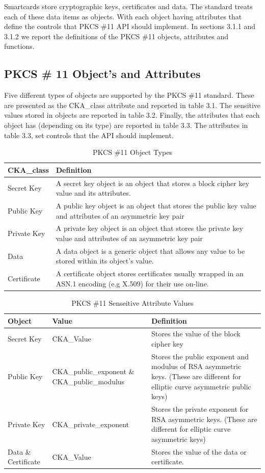 \documentclass[bsc,frontabs,twoside,singlespacing,parskip,deptreport]{infthesis}     %
\begin{document}
Smartcards store cryptographic keys, certificates and data. The standard treats each of these data items as objects. With each object having attributes that define the controls that PKCS \#11 API should implement. In sections 3.1.1 and 3.1.2 we report the definitions of the PKCS \#11 objects, attributes and functions.

\pagebreak
\subsection{PKCS \# 11 Object's and Attributes}

Five different types of objects are supported by the PKCS \#11 standard. These are presented as the CKA\_class attribute and reported in table 3.1. The sensitive values stored in objects are reported in table 3.2. Finally, the attributes that each object has (depending on its type) are reported in table 3.3. The attributes in table 3.3, set controls that the API should implement.

\begin{table}[H]
\begin{tabular}{|l|p{10cm}|}
\hline 
CKA\_class & Definition\\
\hline
Secret Key & A secret key object is an object that stores a block cipher key value and its attributes.\\
\hline
Public Key & A public key object is an object that stores the public key value and attributes of an asymmetric key pair\\
\hline
Private Key & A private key object is an object that stores the private key value and attributes of an asymmetric key pair\\
\hline
Data & A data object is a generic object that allows any value to be stored within its object's value.\\
\hline
Certificate & A certificate object stores certificates usually wrapped in an ASN.1 encoding (e.g X.509) for their use on-line.\\
\hline
\end{tabular}
\caption{PKCS \#11 Object Types}
\end{table}

\begin{table}[H]
\hskip-1.5cm\begin{tabular}{|p{3cm}|p{5cm}|p{10cm}|}
\hline
Object & Value & Definition\\
\hline
Secret Key & CKA\_Value & Stores the value of the block cipher key\\
\hline
Public Key & CKA\_public\_exponent \& CKA\_public\_modulus & Stores the public exponent and modulus of RSA asymmetric keys. (These are different for elliptic curve asymmetric public keys)\\
\hline
Private Key & CKA\_private\_exponent & Stores the private exponent for RSA asymmetric keys. (These are different for elliptic curve asymmetric keys)\\
\hline
Data \& Certificate & CKA\_Value & Stores the value of the data or certificate.\\
\hline
\end{tabular}
\caption{PKCS \#11 Senseitive Attribute Values}
\end{table}
\end{document}
